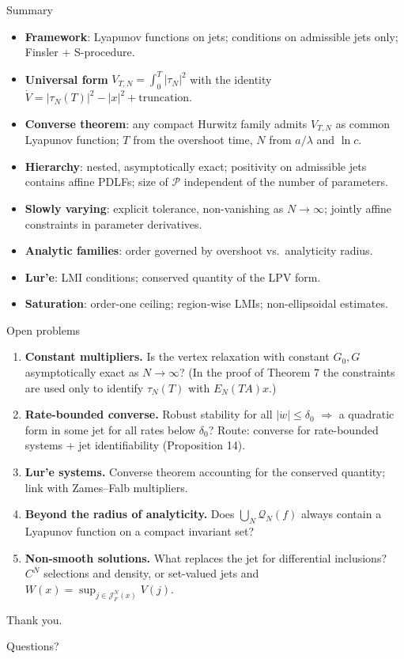 \documentclass[10pt,aspectratio=169]{beamer}
\newcommand{\Jet}{\mathcal{J}}
\newcommand{\PP}{\mathcal{P}}
\begin{document}
\begin{frame}{Summary}
\begin{itemize}
\item \textbf{Framework}: Lyapunov functions on jets; conditions on admissible jets only; Finsler + S-procedure.
\item \textbf{Universal form} $V_{T,N}=\int_0^T|\tau_N|^2$ with the identity $\dot V=|\tau_N(T)|^2-|x|^2+\text{truncation}$.
\item \textbf{Converse theorem}: any compact Hurwitz family admits $V_{T,N}$ as common Lyapunov function; $T$ from the overshoot time, $N$ from $a/\lambda$ and $\ln c$.
\item \textbf{Hierarchy}: nested, asymptotically exact; positivity on admissible jets contains affine PDLFs; size of $\PP$ independent of the number of parameters.
\item \textbf{Slowly varying}: explicit tolerance, non-vanishing as $N\to\infty$; jointly affine constraints in parameter derivatives.
\item \textbf{Analytic families}: order governed by overshoot vs.\ analyticity radius.
\item \textbf{Lur'e}: LMI conditions; conserved quantity of the LPV form.
\item \textbf{Saturation}: order-one ceiling; region-wise LMIs; non-ellipsoidal estimates.
\end{itemize}
\end{frame}

\begin{frame}{Open problems}
\begin{enumerate}
\item \textbf{Constant multipliers.} Is the vertex relaxation with constant $G_0,G$ asymptotically exact as $N\to\infty$? (In the proof of Theorem 7 the constraints are used only to identify $\tau_N(T)$ with $E_N(TA)x$.)
\item \textbf{Rate-bounded converse.} Robust stability for all $|\dot w|\le\delta_0$ $\Rightarrow$ a quadratic form in some jet for all rates below $\delta_0$? Route: converse for rate-bounded systems + jet identifiability (Proposition 14).
\item \textbf{Lur'e systems.} Converse theorem accounting for the conserved quantity; link with Zames--Falb multipliers.
\item \textbf{Beyond the radius of analyticity.} Does $\bigcup_N\mathcal Q_N(f)$ always contain a Lyapunov function on a compact invariant set?
\item \textbf{Non-smooth solutions.} What replaces the jet for differential inclusions? $C^N$ selections and density, or set-valued jets and $W(x)=\sup_{j\in\Jet^N_F(x)}V(j)$.
\end{enumerate}
\end{frame}

\begin{frame}
\centering
\Large Thank you.
\bigskip

\normalsize Questions?
\end{frame}
\end{document}
